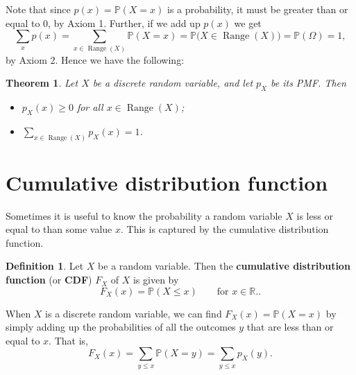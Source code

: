\documentclass[
  a4paper,
]{book}
\providecommand{\tightlist}{%
  \setlength{\itemsep}{0pt}\setlength{\parskip}{0pt}}
\newtheorem{theorem}{Theorem}[chapter]
\theoremstyle{definition}
\newtheorem{definition}{Definition}[chapter]
\theoremstyle{definition}
\theoremstyle{definition}
\theoremstyle{definition}
\theoremstyle{remark}
\begin{document}
Note that since \(p(x) = \mathbb P(X = x)\) is a probability, it must be greater than or equal to 0, by Axiom 1. Further, if we add up \(p(x)\) we get
\[ \sum_{x} p(x) =  \sum_{x \in \operatorname{Range}(X)} \mathbb P(X = x) = \mathbb P\big(X \in \operatorname{Range}(X)\big)  =  \mathbb P(\Omega) = 1,  \]
by Axiom 2.
Hence we have the following:

\begin{theorem}

Let \(X\) be a discrete random variable, and let \(p_X\) be its PMF. Then

\begin{itemize}
\tightlist
\item
  \(p_X(x) \geq 0\) for all \(x \in \operatorname{Range}(X)\);
\item
  \({\displaystyle \sum_{x \in \operatorname{Range}(X)} p_X(x) = 1}\).
\end{itemize}

\end{theorem}

\hypertarget{cdf}{%
\section{Cumulative distribution function}\label{cdf}}

Sometimes it is useful to know the probability a random variable \(X\) is less or equal to than some value \(x\). This is captured by the cumulative distribution function.

\begin{definition}
Let \(X\) be a random variable. Then the
\textbf{cumulative distribution function} (or \textbf{CDF}) \(F_X\) of \(X\) is given by
\[ F_X(x) = \mathbb P(X \leq x) \qquad \text{for $x \in \mathbb R$.} . \]
\end{definition}

When \(X\) is a discrete random variable, we can find \(F_X(x) = \mathbb P(X = x)\) by simply adding up the probabilities of all the outcomes \(y\) that are less than or equal to \(x\). That is,
\[ F_X(x) = \sum_{y \leq x} \mathbb P(X = y) = \sum_{y \leq x} p_X(y) . \]
\end{document}

